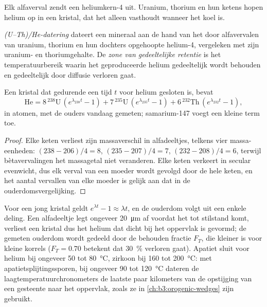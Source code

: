 Elk alfaverval zendt een heliumkern-4 uit. Uranium, thorium en hun ketens
hopen helium op in een kristal, dat het alleen vasthoudt wanneer het koel is.

\begin{definition}\label{def:b3:advanced-geochronology:uthhe}
\emph{(U--Th)/He-datering} dateert een
mineraal aan de hand van het door alfavervalen van uranium, thorium
en hun dochters opgehoopte helium-4, vergeleken met zijn uranium- en thoriumgehalte. De \emph{zone van gedeeltelijke
retentie} is het temperatuurbereik waarin
het geproduceerde helium gedeeltelijk wordt behouden en gedeeltelijk door diffusie verloren gaat.
\end{definition}

\begin{theorem}[Heliumgroei]\label{thm:b3:advanced-geochronology:helium}
Een kristal dat gedurende een tijd $t$ voor helium gesloten is, bevat
\[
\mathrm{He} = 8\,{}^{238}\mathrm U\,(e^{\lambda_{238}t} - 1)
+ 7\,{}^{235}\mathrm U\,(e^{\lambda_{235}t} - 1)
+ 6\,{}^{232}\mathrm{Th}\,(e^{\lambda_{232}t} - 1),
\]
in atomen, met de ouders vandaag gemeten; samarium-147 voegt een kleine term toe.
\end{theorem}

\begin{proof}
Elke keten verliest zijn massaverschil in alfadeeltjes, telkens vier massa-eenheden:
$(238 - 206)/4 = 8$, $(235 - 207)/4 = 7$, $(232 - 208)/4 = 6$, terwijl
bètavervalingen het massagetal niet veranderen. Elke keten verkeert in secular evenwicht,
dus elk verval van een moeder wordt gevolgd door de hele keten, en het aantal
vervallen van elke moeder is gelijk aan dat in de ouderdomsvergelijking.
\end{proof}

Voor een jong kristal geldt $e^{\lambda t} - 1 \approx \lambda t$, en de ouderdom volgt
uit een enkele deling. Een alfadeeltje legt ongeveer
\qty{20}{\micro\metre} af voordat het tot stilstand komt, verliest een kristal dus het helium dat
dicht bij het oppervlak is gevormd; de gemeten ouderdom wordt gedeeld door de behouden fractie $F_T$,
die kleiner is voor kleine korrels ($F_T = 0.70$ betekent dat \qty{30}{\percent}
verloren gaat). Apatiet sluit voor helium bij ongeveer 50 tot \qty{80}{\celsius}, zirkoon bij
160 tot \qty{200}{\celsius}: met apatietsplijtingssporen, bij ongeveer 90 tot
\qty{120}{\celsius} dateren de laagtemperatuurchronometers de laatste paar
kilometers van de opstijging van een gesteente naar het oppervlak, zoals ze
in \cref{ch:b3:orogenic-wedges} zijn gebruikt.

